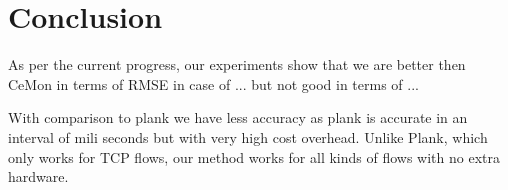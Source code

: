 \cite{curvature}

\section{Conclusion}
As per the current progress, our experiments show that we are better then CeMon in terms of RMSE in case of ...  %
but not good in terms of ... %

With comparison to plank we have less accuracy as plank is accurate in an interval of mili seconds but with very high cost overhead. Unlike Plank, which only works for TCP flows, our method works for all kinds of flows with no extra hardware.




